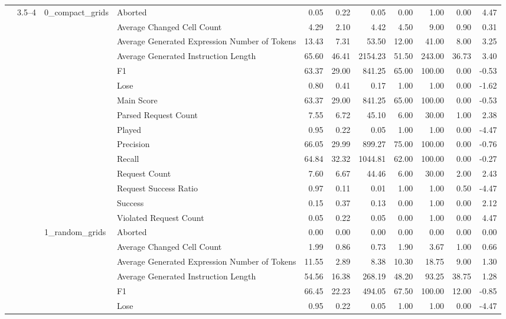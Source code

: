 \begin{tabular}{llllrrrrrrr}
 & \multirow[t]{30}{*}{3.5--4} & \multirow[t]{15}{*}{0_compact_grids} & Aborted & 0.05 & 0.22 & 0.05 & 0.00 & 1.00 & 0.00 & 4.47 \\
 &  &  & Average Changed Cell Count & 4.29 & 2.10 & 4.42 & 4.50 & 9.00 & 0.90 & 0.31 \\
 &  &  & Average Generated Expression Number of Tokens & 13.43 & 7.31 & 53.50 & 12.00 & 41.00 & 8.00 & 3.25 \\
 &  &  & Average Generated Instruction Length & 65.60 & 46.41 & 2154.23 & 51.50 & 243.00 & 36.73 & 3.40 \\
 &  &  & F1 & 63.37 & 29.00 & 841.25 & 65.00 & 100.00 & 0.00 & -0.53 \\
 &  &  & Lose & 0.80 & 0.41 & 0.17 & 1.00 & 1.00 & 0.00 & -1.62 \\
 &  &  & Main Score & 63.37 & 29.00 & 841.25 & 65.00 & 100.00 & 0.00 & -0.53 \\
 &  &  & Parsed Request Count & 7.55 & 6.72 & 45.10 & 6.00 & 30.00 & 1.00 & 2.38 \\
 &  &  & Played & 0.95 & 0.22 & 0.05 & 1.00 & 1.00 & 0.00 & -4.47 \\
 &  &  & Precision & 66.05 & 29.99 & 899.27 & 75.00 & 100.00 & 0.00 & -0.76 \\
 &  &  & Recall & 64.84 & 32.32 & 1044.81 & 62.00 & 100.00 & 0.00 & -0.27 \\
 &  &  & Request Count & 7.60 & 6.67 & 44.46 & 6.00 & 30.00 & 2.00 & 2.43 \\
 &  &  & Request Success Ratio & 0.97 & 0.11 & 0.01 & 1.00 & 1.00 & 0.50 & -4.47 \\
 &  &  & Success & 0.15 & 0.37 & 0.13 & 0.00 & 1.00 & 0.00 & 2.12 \\
 &  &  & Violated Request Count & 0.05 & 0.22 & 0.05 & 0.00 & 1.00 & 0.00 & 4.47 \\
\cline{3-11}
 &  & \multirow[t]{15}{*}{1_random_grids} & Aborted & 0.00 & 0.00 & 0.00 & 0.00 & 0.00 & 0.00 & 0.00 \\
 &  &  & Average Changed Cell Count & 1.99 & 0.86 & 0.73 & 1.90 & 3.67 & 1.00 & 0.66 \\
 &  &  & Average Generated Expression Number of Tokens & 11.55 & 2.89 & 8.38 & 10.30 & 18.75 & 9.00 & 1.30 \\
 &  &  & Average Generated Instruction Length & 54.56 & 16.38 & 268.19 & 48.20 & 93.25 & 38.75 & 1.28 \\
 &  &  & F1 & 66.45 & 22.23 & 494.05 & 67.50 & 100.00 & 12.00 & -0.85 \\
 &  &  & Lose & 0.95 & 0.22 & 0.05 & 1.00 & 1.00 & 0.00 & -4.47 \\

\end{tabular}
